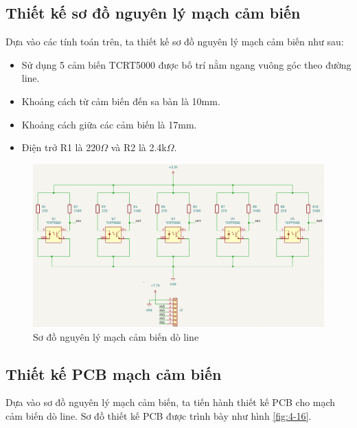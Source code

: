         \subsection{Thiết kế sơ đồ nguyên lý mạch cảm biến}
            \hspace*{0.6cm}Dựa vào các tính toán trên, ta thiết kế sơ đồ nguyên lý mạch cảm biến như sau:
            \begin{itemize}
                \item Sử dụng 5 cảm biến TCRT5000 được bố trí nằm ngang vuông góc theo đường line.
                \item Khoảng cách từ cảm biến đến sa bàn là 10mm.
                \item Khoảng cách giữa các cảm biến là 17mm.
                \item Điện trở R1 là 220$\Omega$ và R2 là 2.4k$\Omega$.
            \end{itemize}
            \begin{figure}[H]
                \centering
                \includegraphics[width=1\textwidth]{pictures/chapter4/c4_p10_SensorSchematic.png}
                \caption{Sơ đồ nguyên lý mạch cảm biến dò line}
                \label{fig:4-15}
            \end{figure}
        \subsection{Thiết kế PCB mạch cảm biến}

            \hspace*{0.6cm}Dựa vào sơ đồ nguyên lý mạch cảm biến, ta tiến hành thiết kế PCB cho mạch cảm biến dò line. Sơ đồ thiết kế PCB được trình bày như hình \ref{fig:4-16}.

